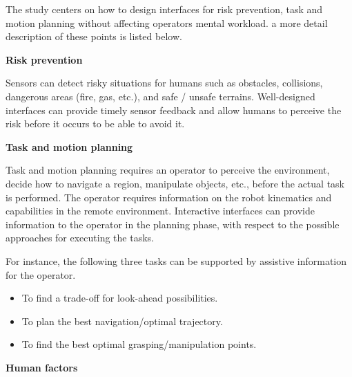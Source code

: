 The study centers on how to design interfaces for risk prevention, task and motion planning without affecting operators mental workload. a more detail description of these points is listed below. 

\textbf{Risk prevention}

Sensors can detect risky situations for humans such as obstacles, collisions, dangerous areas (fire, gas, etc.), and safe / unsafe terrains. Well-designed interfaces can provide timely sensor feedback and allow humans to perceive the risk before it occurs to be able to avoid it.


\textbf{Task and motion planning}

Task and motion planning requires an operator to perceive the environment, decide how to navigate a region, manipulate objects, etc., before the actual task is performed. The operator requires information on the robot kinematics and capabilities in the remote environment. Interactive interfaces can provide information to the operator in the planning phase, with respect to the possible approaches for executing the tasks.

For instance, the following three tasks can be supported by assistive information for the operator.
\begin{itemize}
    \item To find a trade-off for look-ahead possibilities.
    \item To plan the best navigation/optimal trajectory.
    \item To find the best optimal grasping/manipulation points.
\end{itemize}

\textbf{Human factors}

